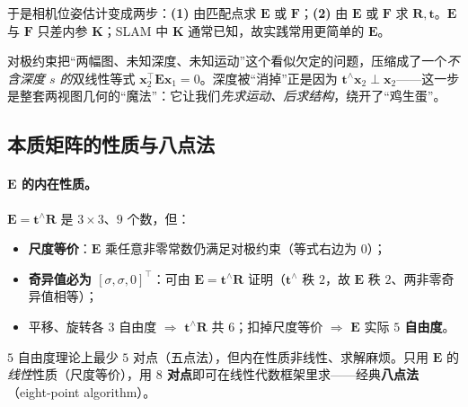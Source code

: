 \noindent 于是相机位姿估计变成两步：\textbf{(1)} 由匹配点求 $\mathbf{E}$ 或 $\mathbf{F}$；\textbf{(2)} 由 $\mathbf{E}$ 或 $\mathbf{F}$ 求 $\mathbf{R},\mathbf{t}$。$\mathbf{E}$ 与 $\mathbf{F}$ 只差内参 $\mathbf{K}$；SLAM 中 $\mathbf{K}$ 通常已知，故实践常用更简单的 $\mathbf{E}$。

\begin{insight}
对极约束把“两幅图、未知深度、未知运动”这个看似欠定的问题，压缩成了一个\emph{不含深度 $s$ 的}双线性等式 $\mathbf{x}_2^\top\mathbf{E}\mathbf{x}_1=0$。深度被“消掉”正是因为 $\mathbf{t}^\wedge\mathbf{x}_2\perp\mathbf{x}_2$——这一步是整套两视图几何的“魔法”：它让我们\emph{先求运动、后求结构}，绕开了“鸡生蛋”。
\end{insight}

\subsection{本质矩阵的性质与八点法}
\label{sec:vo-eight-point}

\paragraph{$\mathbf{E}$ 的内在性质\cite{gaoxiang2019slam14}。}$\mathbf{E}=\mathbf{t}^\wedge\mathbf{R}$ 是 $3\times3$、$9$ 个数，但：
\begin{itemize}
  \item \textbf{尺度等价}：$\mathbf{E}$ 乘任意非零常数仍满足对极约束（等式右边为 $0$）；
  \item \textbf{奇异值必为 $[\sigma,\sigma,0]^\top$}：可由 $\mathbf{E}=\mathbf{t}^\wedge\mathbf{R}$ 证明\cite{gaoxiang2019slam14}（$\mathbf{t}^\wedge$ 秩 $2$，故 $\mathbf{E}$ 秩 $2$、两非零奇异值相等）；
  \item 平移、旋转各 $3$ 自由度 $\Rightarrow$ $\mathbf{t}^\wedge\mathbf{R}$ 共 $6$；扣掉尺度等价 $\Rightarrow$ $\mathbf{E}$ 实际 \textbf{$5$ 自由度}。
\end{itemize}
$5$ 自由度理论上最少 $5$ 对点（五点法\cite{gaoxiang2019slam14}），但内在性质非线性、求解麻烦。只用 $\mathbf{E}$ 的\emph{线性}性质（尺度等价），用 \textbf{$8$ 对点}即可在线性代数框架里求——经典\textbf{八点法}（eight-point algorithm）。

